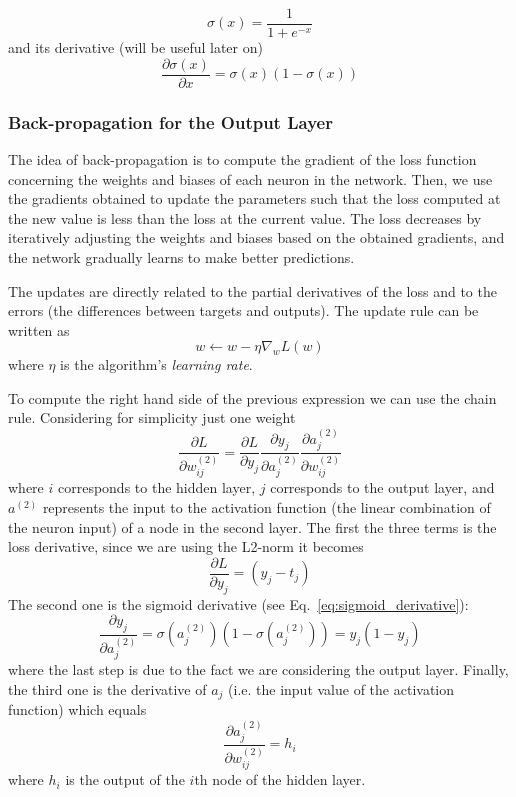 \begin{equation}
  \sigma(x) = \frac{1}{1+e^{-x}}
\end{equation} 
and its derivative (will be useful later on)
\begin{equation}
  \frac{\partial\sigma(x)}{\partial x} = \sigma(x)(1-\sigma(x))
  \label{eq:sigmoid_derivative}
\end{equation} 

\subsubsection{Back-propagation for the Output Layer}
The idea of back-propagation is to compute the gradient of the loss function concerning the weights and biases of each neuron in the network. Then, we use the gradients obtained to update the parameters such that the loss computed at the new value is less than the loss at the current value. The loss decreases by iteratively adjusting the weights and biases based on the obtained gradients, and the network gradually learns to make better predictions.

The updates are directly related to the partial derivatives of the loss and to the errors (the differences between targets and outputs). The update rule can be written as
\begin{equation}
  w \leftarrow w - \eta\nabla_w L(w)
\end{equation}
where $\eta$ is the algorithm's \emph{learning rate}.

To compute the right hand side of the previous expression we can use the chain rule. Considering for simplicity just one weight 
\begin{equation}
  \frac{\partial L}{\partial w^{(2)}_{ij}} = \frac{\partial L}{\partial y_j}\frac{\partial y_j}{\partial a^{(2)}_j}\frac{\partial a^{(2)}_j}{\partial w^{(2)}_{ij}}
\label{eq:backprop_output}
\end{equation}
where $i$ corresponds to the hidden layer, $j$ corresponds to the output layer, and $a^{(2)}$ represents the input to the activation function (the linear combination of the neuron input) of a node in the second layer.
The first the three terms is the loss derivative, since we are using the L2-norm it becomes
\begin{equation}
  \frac{\partial L}{\partial y_j} = (y_j - t_j)
\end{equation}
The second one is the sigmoid derivative (see Eq.~\ref{eq:sigmoid_derivative}):
\begin{equation}
  \frac{\partial y_j}{\partial a^{(2)}_j} = \sigma(a^{(2)}_j)(1-\sigma(a^{(2)}_j)) = y_j(1 - y_j)
\end{equation}
where the last step is due to the fact we are considering the output layer.
Finally, the third one is the derivative of $a_j$ (i.e. the input value of the activation function) which equals
\begin{equation}
  \frac{\partial a^{(2)}_j}{\partial w^{(2)}_{ij}} = h_i
\end{equation}
where $h_i$ is the output of the $i$th node of the hidden layer.

